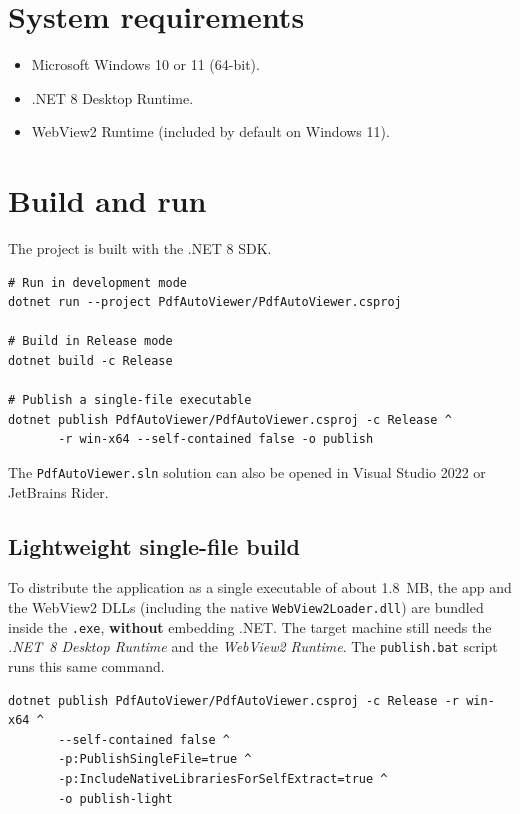 \documentclass[11pt,a4paper]{article}
\begin{document}
\section{System requirements}
\begin{itemize}[leftmargin=1.4em,itemsep=2pt]
  \item Microsoft Windows 10 or 11 (64-bit).
  \item .NET 8 Desktop Runtime.
  \item WebView2 Runtime (included by default on Windows 11).
\end{itemize}

\section{Build and run}
The project is built with the .NET 8 SDK.

\begin{lstlisting}[caption={Build and run.}]
# Run in development mode
dotnet run --project PdfAutoViewer/PdfAutoViewer.csproj

# Build in Release mode
dotnet build -c Release

# Publish a single-file executable
dotnet publish PdfAutoViewer/PdfAutoViewer.csproj -c Release ^
       -r win-x64 --self-contained false -o publish
\end{lstlisting}

The \texttt{PdfAutoViewer.sln} solution can also be opened in Visual Studio 2022 or
JetBrains Rider.

\subsection{Lightweight single-file build}
To distribute the application as a single executable of about 1.8~MB, the app and
the WebView2 DLLs (including the native \texttt{WebView2Loader.dll}) are bundled
inside the \texttt{.exe}, \textbf{without} embedding .NET. The target machine still
needs the \emph{.NET~8 Desktop Runtime} and the \emph{WebView2 Runtime}. The
\texttt{publish.bat} script runs this same command.

\begin{lstlisting}[caption={Lightweight build (single file, no embedded .NET).}]
dotnet publish PdfAutoViewer/PdfAutoViewer.csproj -c Release -r win-x64 ^
       --self-contained false ^
       -p:PublishSingleFile=true ^
       -p:IncludeNativeLibrariesForSelfExtract=true ^
       -o publish-light
\end{lstlisting}
\end{document}

